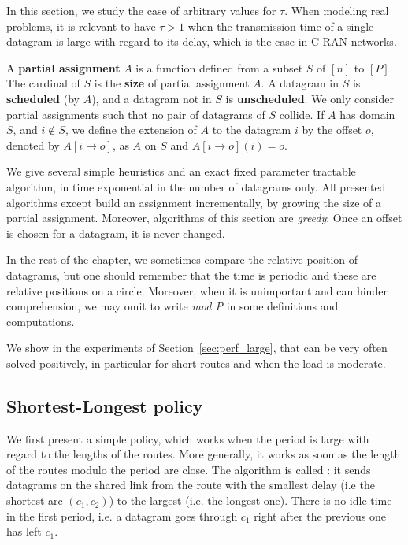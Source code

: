 In this section, we study the case of arbitrary values for $\tau$. When modeling real problems,
it is relevant to have $\tau > 1$ when the transmission time of a single datagram is large with regard to its delay,
which is the case in C-RAN networks.

A \textbf{partial assignment} $A$ is a function defined from a subset $S$ of $[n]$ to $[P]$.
The cardinal of $S$ is the \textbf{size} of partial assignment $A$. A datagram in $S$ is \textbf{scheduled} (by $A$), and a datagram not in $S$ is \textbf{unscheduled}. We only consider partial assignments such that no pair of datagrams of $S$ collide. If $A$ has domain $S$, and $i \notin S$, we define the extension of $A$ to the datagram $i$ by the offset $o$, denoted by $A[i \rightarrow o]$, as $A$ on $S$ and $A[i \rightarrow o](i) = o$.

  We give several simple heuristics and an exact fixed parameter tractable algorithm, in time exponential in the number of datagrams only. 
All presented algorithms except \exactresolution build an assignment incrementally, by growing the size of a partial assignment. Moreover, algorithms of this section are \emph{greedy}: Once an offset is chosen for a datagram, it is never changed. 

In the rest of the chapter, we sometimes compare the relative position of datagrams, but one should remember that the
time is periodic and these are relative positions on a circle. Moreover, when it is unimportant and can hinder comprehension, we may omit to write \emph{mod P} in some definitions and computations.

We show in the experiments of Section~\ref{sec:perf_large}, that \pazl can be very often solved positively, in particular for short routes and when the load is moderate.



  \subsection{Shortest-Longest policy}
   


    We first present a simple policy, which works when the period is large with regard to the lengths of the routes. More generally, it works as soon as the length of the routes modulo the period are close. The algorithm is called \shortestlongest: it sends datagrams on the shared link from the route with the smallest delay (i.e the shortest arc $(c_1,c_2)$) to the largest (i.e. the longest one). There is no idle time in the first period, i.e. a datagram goes through $c_1$ right after the previous one has left $c_1$.


